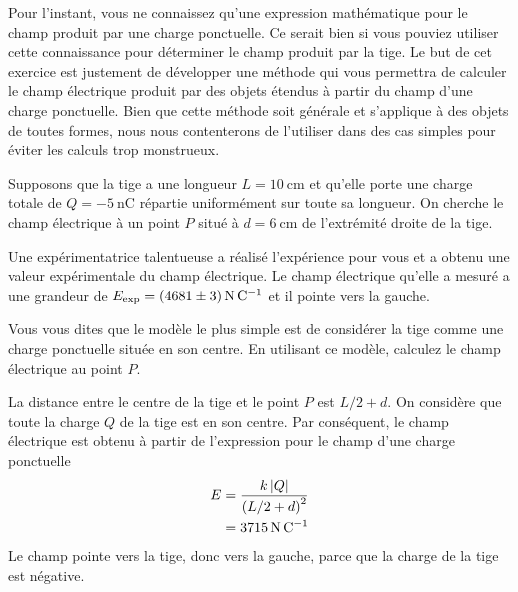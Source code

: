 Pour l'instant, vous ne connaissez qu'une expression mathématique pour le champ
produit par une charge ponctuelle. Ce serait bien si vous pouviez utiliser
cette connaissance pour déterminer le champ produit par la tige. Le but de cet
exercice est justement de développer une méthode qui vous permettra de calculer
le champ électrique produit par des objets étendus à partir du champ d'une
charge ponctuelle. Bien que cette méthode soit générale et s'applique à des
objets de toutes formes, nous nous contenterons de l'utiliser dans des cas
simples pour éviter les calculs trop monstrueux.


Supposons que la tige a une longueur $L = \SI{10}{\centi\meter}$ et qu'elle
porte une charge totale de $Q = \SI{-5}{\nano\coulomb}$ répartie uniformément
sur toute sa longueur. On cherche le champ électrique à un point $P$ situé à
$d = \SI{6}{\centi\meter}$ de l'extrémité droite de la tige.

Une expérimentatrice talentueuse a réalisé l'expérience pour vous et a obtenu
une valeur expérimentale du champ électrique. Le champ électrique qu'elle a
mesuré a une grandeur de $E_\mathrm{exp} =
\SI{4681 \pm 3}{\newton\per\coulomb}$ et il pointe vers la gauche.


Vous vous dites que le modèle le plus simple est de considérer la tige comme
une charge ponctuelle située en son centre. En utilisant ce modèle, calculez le
champ électrique au point $P$.

\begin{reponsebox}
  La distance entre le centre de la tige et le point $P$ est $L/2 + d$. On
  considère que toute la charge $Q$ de la tige est en son centre. Par
  conséquent, le champ électrique est obtenu à partir de l'expression pour le
  champ d'une charge ponctuelle
  \begin{align*}
    E &= \frac{k\left| Q \right|}{\left(L/2 + d\right)^2}  \\
      &= \SI{3715}{\newton\per\coulomb}
  \end{align*}
  Le champ pointe vers la tige, donc vers la gauche, parce que la charge de la
  tige est négative.
\end{reponsebox}


